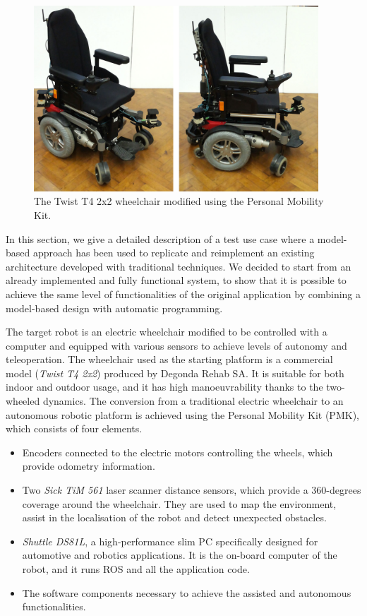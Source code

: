 \begin{figure}[t]
\centering
\includegraphics[width=0.95\textwidth]{gfx/pmk/pmk_plat}
\caption{The Twist T4 2x2 wheelchair modified using the Personal Mobility Kit.}
\label{fig:pmk}
\end{figure}

In this section, we give a detailed description of a test use case where a model-based approach has been used to replicate and reimplement an existing architecture developed with traditional techniques. We decided to start from an already implemented and fully functional system, to show that it is possible to achieve the same level of functionalities of the original application by combining a model-based design with automatic programming.

The target robot is an electric wheelchair modified to be controlled with a computer and equipped with various sensors to achieve levels of autonomy and teleoperation. The wheelchair used as the starting platform is a commercial model (\textit{Twist T4 2x2}) produced by Degonda Rehab SA. It is suitable for both indoor and outdoor usage, and it has high manoeuvrability thanks to the two-wheeled dynamics. The conversion from a traditional electric wheelchair to an autonomous robotic platform is achieved using the Personal Mobility Kit (PMK), which consists of four elements.
\begin{itemize}
\item Encoders connected to the electric motors controlling the wheels, which provide odometry information.
\item Two \textit{Sick TiM 561} laser scanner distance sensors, which provide a 360-degrees coverage around the wheelchair. They are used to map the environment, assist in the localisation of the robot and detect unexpected obstacles.
\item \textit{Shuttle DS81L}, a high-performance slim PC specifically designed for automotive and robotics applications. It is the on-board computer of the robot, and it runs ROS and all the application code.
\item The software components necessary to achieve the assisted and autonomous functionalities.
\end{itemize}

